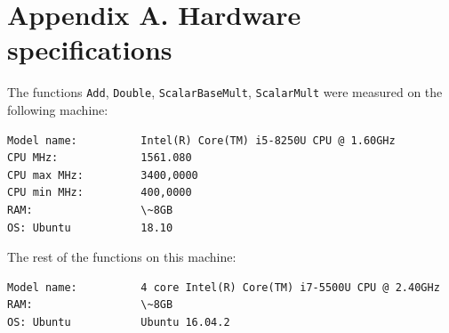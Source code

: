 \documentclass[a4paper]{scrartcl}
\begin{document}
\section{Appendix A. Hardware specifications}
The functions \verb+Add+, \verb+Double+, \verb+ScalarBaseMult+, \verb+ScalarMult+ were measured on the following machine:
\begin{lstlisting}[caption=Hardware specifications of the machine A, captionpos=b]
Model name:          Intel(R) Core(TM) i5-8250U CPU @ 1.60GHz
CPU MHz:             1561.080
CPU max MHz:         3400,0000
CPU min MHz:         400,0000
RAM:                 \~8GB
OS: Ubuntu           18.10
\end{lstlisting}

The rest of the functions on this machine:
\begin{lstlisting}[caption=Hardware specifications of the machine B, captionpos=b]
Model name:          4 core Intel(R) Core(TM) i7-5500U CPU @ 2.40GHz
RAM:                 \~8GB
OS: Ubuntu           Ubuntu 16.04.2
\end{lstlisting}
\end{document}
